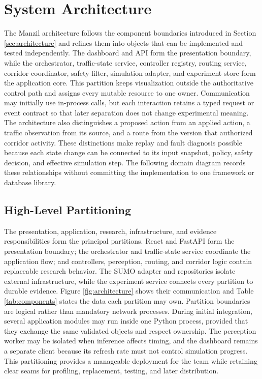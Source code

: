 \section{System Architecture}

The Manzil architecture follows the component boundaries introduced in Section \ref{sec:architecture} and refines them into objects that can be implemented and tested independently. The dashboard and API form the presentation boundary, while the orchestrator, traffic-state service, controller registry, routing service, corridor coordinator, safety filter, simulation adapter, and experiment store form the application core. This partition keeps visualization outside the authoritative control path and assigns every mutable resource to one owner. Communication may initially use in-process calls, but each interaction retains a typed request or event contract so that later separation does not change experimental meaning. The architecture also distinguishes a proposed action from an applied action, a traffic observation from its source, and a route from the version that authorized corridor activity. These distinctions make replay and fault diagnosis possible because each state change can be connected to its input snapshot, policy, safety decision, and effective simulation step. The following domain diagram records these relationships without committing the implementation to one framework or database library.

\subsection{High-Level Partitioning}

The presentation, application, research, infrastructure, and evidence responsibilities form the principal partitions. React and FastAPI form the presentation boundary; the orchestrator and traffic-state service coordinate the application flow; and controllers, perception, routing, and corridor logic contain replaceable research behavior. The SUMO adapter and repositories isolate external infrastructure, while the experiment service connects every partition to durable evidence. Figure \ref{fig:architecture} shows their communication and Table \ref{tab:components} states the data each partition may own. Partition boundaries are logical rather than mandatory network processes. During initial integration, several application modules may run inside one Python process, provided that they exchange the same validated objects and respect ownership. The perception worker may be isolated when inference affects timing, and the dashboard remains a separate client because its refresh rate must not control simulation progress. This partitioning provides a manageable deployment for the team while retaining clear seams for profiling, replacement, testing, and later distribution.


